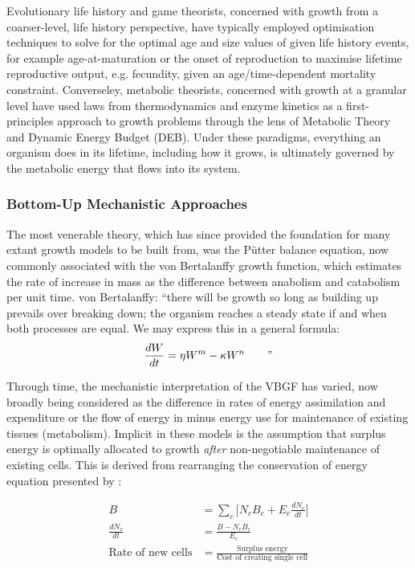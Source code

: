 \documentclass[a4paper]{article} %
\begin{document}
        Evolutionary life history and game theorists, concerned with growth from a coarser-level, life history perspective, have typically employed optimisation techniques to solve for the optimal age and size values of given life history events, for example age-at-maturation or the onset of reproduction to maximise lifetime reproductive output, e.g. fecundity, given an age/time-dependent mortality constraint. Converseley, metabolic theorists, concerned with growth at a granular level have used laws from thermodynamics and enzyme kinetics as a first-principles approach to growth problems through the lens of Metabolic Theory and Dynamic Energy Budget (DEB). Under these paradigms, everything an organism does in its lifetime, including how it grows, is ultimately governed by the metabolic energy that flows into its system. 

        \subsubsection{Bottom-Up Mechanistic Approaches}
        The most venerable theory, which has since provided the foundation for many extant growth models to be built from, was the P\"{u}tter balance equation, now commonly associated with the von Bertalanffy growth function, which estimates the rate of increase in mass as the difference between anabolism and catabolism per unit time. \autocite{Putter1920, vonBert1938, VonBertalanffy1957,Marshall2019b}
        von Bertalanffy: ``there will be growth so long as building up prevails over breaking down; the organism reaches a steady state if and when both processes are equal. We may express this in a general formula: 
        \begin{equation}
            \frac{dW}{dt} = \eta W^m - \kappa W^n \text{\qquad ''}
        \end{equation}

        Through time, the mechanistic interpretation of the VBGF has varied, now broadly being considered as the difference in rates of energy assimilation and expenditure or the flow of energy in minus energy use for maintenance of existing tissues (metabolism). Implicit in these models is the assumption that surplus energy is optimally allocated to growth \textit{after} non-negotiable maintenance of existing cells. This is derived from rearranging the conservation of energy equation presented by \cite{West2001}:

        \begin{align}
            B &= \sum_c \Bigg[N_{c}B_{c} + E_{c}\frac{dN_{c}}{dt}\Bigg] \\
            \frac{dN_{c}}{dt} &= \frac{B - N_{c}B_{c}}{E_{c}} \\
            \text{Rate of new cells} &= \frac{\text{Surplus energy}}{\text{Cost of creating single cell}}
        \end{align}
\end{document}
